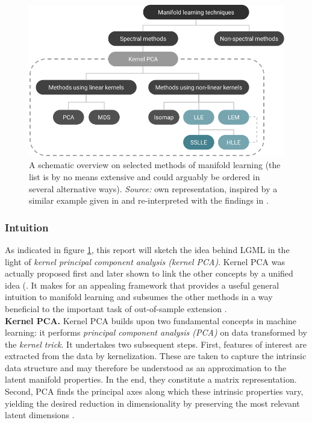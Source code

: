 \begin{figure}[H]
    \centering
    \includegraphics[trim = 0 0 0 0, clip, %
      width = \textwidth]{figures/models_overview}
    \caption[Overview on selected manifold learning models]{A schematic overview 
    on selected methods of manifold learning (the list is by no means extensive 
    and could arguably be ordered in several alternative ways). 
    \textit{Source:} own representation, inspired by a similar example given in 
    \citet{vandermaatenetal2009} and re-interpreted with the findings in 
    \citet{bengioetal2004}.}
    \label{fig-models-overview}
  \end{figure}


\subsubsection{Intuition}
\label{intuition}

As indicated in figure \ref{fig-models-overview}, this report will 
sketch the idea behind LGML in the light of 
\textit{kernel principal component analysis (kernel PCA)}.
Kernel PCA was actually proposed first and later shown to link the other 
concepts by a unified idea (\citet{hametal2003}.
It makes for an appealing framework that provides a useful general 
intuition to manifold learning and subsumes the other methods in a 
way beneficial to the important task of out-of-sample extension \citep{bengioetal2004}.
\\

\textbf{Kernel PCA.} Kernel PCA builds upon two fundamental concepts 
in machine learning: it performs \textit{principal component analysis (PCA)} on 
data transformed by the \textit{kernel trick}.
It undertakes two subsequent steps.
First, features of interest are extracted from the data by kernelization. 
These are taken to capture the intrinsic data structure and may therefore be 
understood as an approximation to the latent manifold properties.
In the end, they constitute a matrix representation.
Second, PCA finds the principal axes along which these intrinsic properties 
vary, yielding the desired reduction in dimensionality by preserving the most 
relevant latent dimensions \citep{schoelkopfetal1998}.

